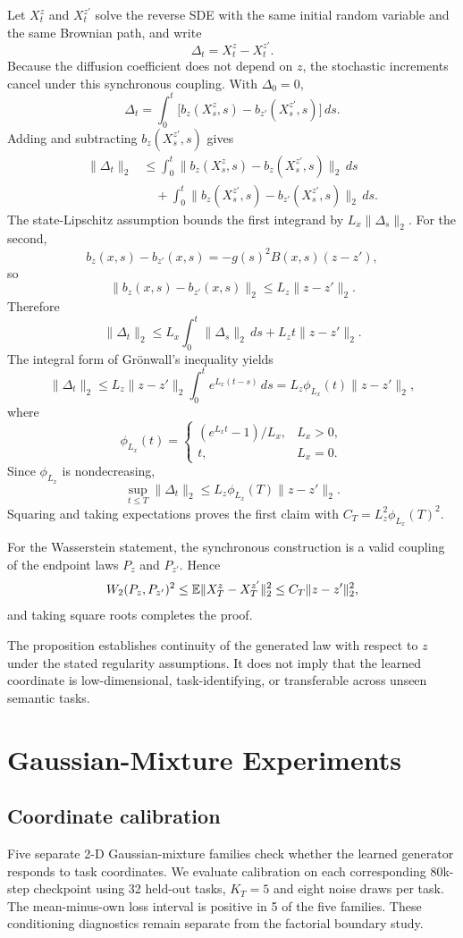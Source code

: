 Let $X_t^z$ and $X_t^{z'}$ solve the reverse SDE with the same initial random variable and the same Brownian path, and write
\[
\Delta_t=X_t^z-X_t^{z'}.
\]
Because the diffusion coefficient does not depend on $z$, the stochastic increments cancel under this synchronous coupling. With $\Delta_0=0$,
\[
\Delta_t
=
\int_0^t
\bigl[
b_z(X_s^z,s)-b_{z'}(X_s^{z'},s)
\bigr]\,ds.
\]
Adding and subtracting $b_z(X_s^{z'},s)$ gives
\begin{align*}
\|\Delta_t\|_2
&\leq
\int_0^t
\|b_z(X_s^z,s)-b_z(X_s^{z'},s)\|_2\,ds\\
&\quad+
\int_0^t
\|b_z(X_s^{z'},s)-b_{z'}(X_s^{z'},s)\|_2\,ds.
\end{align*}
The state-Lipschitz assumption bounds the first integrand by $L_x\|\Delta_s\|_2$. For the second,
\[
b_z(x,s)-b_{z'}(x,s)
=
-g(s)^2B(x,s)(z-z'),
\]
so
\[
\|b_z(x,s)-b_{z'}(x,s)\|_2
\leq
L_z\|z-z'\|_2.
\]
Therefore
\[
\|\Delta_t\|_2
\leq
L_x\int_0^t\|\Delta_s\|_2\,ds
+
L_z t\|z-z'\|_2.
\]
The integral form of Gr\"onwall's inequality yields
\[
\|\Delta_t\|_2
\leq
L_z\|z-z'\|_2
\int_0^t e^{L_x(t-s)}\,ds
=
L_z\phi_{L_x}(t)\|z-z'\|_2,
\]
where
\[
\phi_{L_x}(t)=
\begin{cases}
(e^{L_xt}-1)/L_x,&L_x>0,\\
t,&L_x=0.
\end{cases}
\]
Since $\phi_{L_x}$ is nondecreasing,
\[
\sup_{t\leq T}\|\Delta_t\|_2
\leq
L_z\phi_{L_x}(T)\|z-z'\|_2.
\]
Squaring and taking expectations proves the first claim with
$C_T=L_z^2\phi_{L_x}(T)^2$.

For the Wasserstein statement, the synchronous construction is a valid coupling of the endpoint laws $P_z$ and $P_{z'}$. Hence
\[
W_2(P_z,P_{z'})^2
\leq
\mathbb{E}\|X_T^z-X_T^{z'}\|_2^2
\leq
C_T\|z-z'\|_2^2,
\]
and taking square roots completes the proof.

The proposition establishes continuity of the generated law with respect to $z$ under the stated regularity assumptions. It does not imply that the learned coordinate is low-dimensional, task-identifying, or transferable across unseen semantic tasks.

\FloatBarrier

\section{Gaussian-Mixture Experiments}
\label{app:gmm}

\subsection{Coordinate calibration}
Five separate 2-D Gaussian-mixture families check whether the learned generator responds to task coordinates. We evaluate calibration on each corresponding 80k-step checkpoint using 32 held-out tasks, $K_T=5$ and eight noise draws per task. The mean-minus-own loss interval is positive in 5 of the five families. These conditioning diagnostics remain separate from the factorial boundary study.

